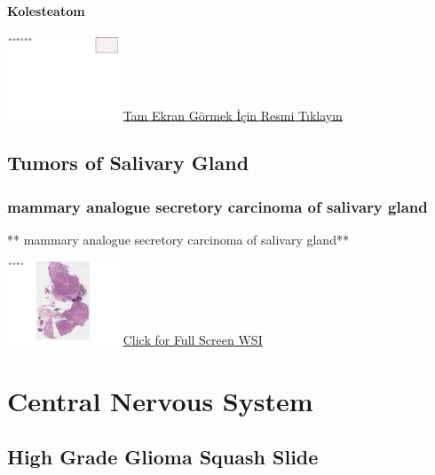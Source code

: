 \documentclass[
  letterpaper,
  paper=6in:9in,
  pagesize=pdftex,
  headinclude=on,
  footinclude=on,
  12pt]{scrbook}
\begin{document}
\hypertarget{sec-kolesteatom}{%
\subsection{Kolesteatom}\label{sec-kolesteatom}}

\href{https://images.patolojiatlasi.com/template/HE.html}{\includegraphics[width=0.25\textwidth,height=\textheight]{./screenshots/template_screenshot.png}}
\href{https://images.patolojiatlasi.com/cholesteatoma/cholesteatoma.html}{Tam
Ekran Görmek İçin Resmi Tıklayın}

\hypertarget{sec-salivary-gland-tumors}{%
\chapter{Tumors of Salivary Gland}\label{sec-salivary-gland-tumors}}

\hypertarget{mammary-analogue-secretory-carcinoma-of-salivary-gland}{%
\section{mammary analogue secretory carcinoma of salivary
gland}\label{mammary-analogue-secretory-carcinoma-of-salivary-gland}}

** mammary analogue secretory carcinoma of salivary gland**

\href{https://images.patolojiatlasi.com/mammary-analogue-secretory-carcinoma/HE1.html}{\includegraphics[width=0.25\textwidth,height=\textheight]{./screenshots/mammary-analogue-secretory-carcinoma1_screenshot.png}}
\href{https://images.patolojiatlasi.com/mammary-analogue-secretory-carcinoma/HE1.html}{Click
for Full Screen WSI}

\part{Central Nervous System}

\hypertarget{sec-high-grade-glioma-squash-slide}{%
\chapter{High Grade Glioma Squash
Slide}\label{sec-high-grade-glioma-squash-slide}}
\end{document}
